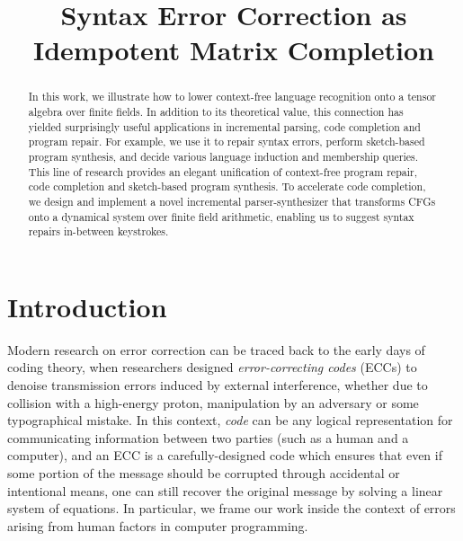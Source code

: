 \documentclass[sigplan,review,anonymous,acmsmall]{acmart}\settopmatter{printfolios=false,printccs=false,printacmref=false}
\begin{document}
    \title{Syntax Error Correction as Idempotent Matrix Completion}
    \begin{abstract}
      In this work, we illustrate how to lower context-free language recognition onto a tensor algebra over finite fields. In addition to its theoretical value, this connection has yielded surprisingly useful applications in incremental parsing, code completion and program repair. For example, we use it to repair syntax errors, perform sketch-based program synthesis, and decide various language induction and membership queries. This line of research provides an elegant unification of context-free program repair, code completion and sketch-based program synthesis. To accelerate code completion, we design and implement a novel incremental parser-synthesizer that transforms CFGs onto a dynamical system over finite field arithmetic, enabling us to suggest syntax repairs in-between keystrokes.
    \end{abstract}


    \maketitle

    \section{Introduction}

    Modern research on error correction can be traced back to the early days of coding theory, when researchers designed \textit{error-correcting codes} (ECCs) to denoise transmission errors induced by external interference, whether due to collision with a high-energy proton, manipulation by an adversary or some typographical mistake. In this context, \textit{code} can be any logical representation for communicating information between two parties (such as a human and a computer), and an ECC is a carefully-designed code which ensures that even if some portion of the message should be corrupted through accidental or intentional means, one can still recover the original message by solving a linear system of equations. In particular, we frame our work inside the context of errors arising from human factors in computer programming.
\end{document}
